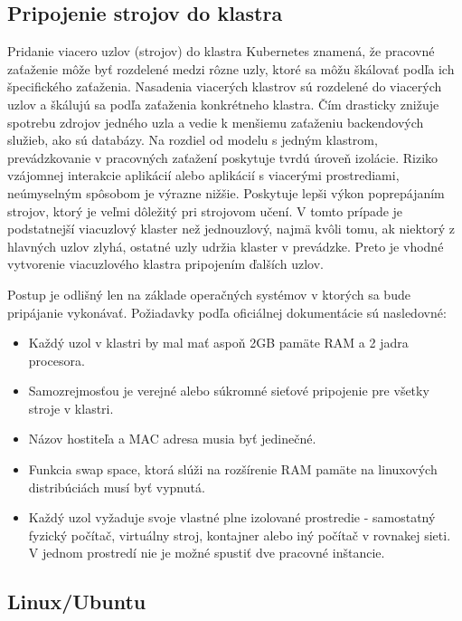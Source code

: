 \subsection{Pripojenie strojov do klastra}

Pridanie viacero uzlov (strojov) do klastra Kubernetes znamená, že pracovné zaťaženie môže byť rozdelené medzi rôzne uzly, ktoré sa môžu škálovať podľa ich špecifického zaťaženia. Nasadenia viacerých klastrov sú rozdelené do viacerých uzlov a škálujú sa podľa zaťaženia konkrétneho klastra. Čím drasticky znižuje spotrebu zdrojov jedného uzla a vedie k menšiemu zaťaženiu backendových služieb, ako sú databázy. Na rozdiel od modelu s jedným klastrom, prevádzkovanie v pracovných zaťažení poskytuje tvrdú úroveň izolácie. Riziko vzájomnej interakcie aplikácií alebo aplikácií s viacerými prostrediami, neúmyselným spôsobom je výrazne nižšie. Poskytuje lepši výkon poprepájaním strojov, ktorý je veľmi dôležitý pri strojovom učení. V tomto prípade je podstatnejší viacuzlový klaster než jednouzlový, najmä kvôli tomu, ak niektorý z hlavných uzlov zlyhá, ostatné uzly udržia klaster v prevádzke. Preto je vhodné vytvorenie viacuzlového klastra pripojením ďalších uzlov.

Postup je odlišný len na základe operačných systémov v ktorých sa bude pripájanie vykonávať. Požiadavky podľa oficiálnej dokumentácie sú nasledovné:

\begin{itemize}
    \item Každý uzol v klastri by mal mať aspoň 2GB pamäte RAM a 2 jadra procesora.
    \item Samozrejmosťou je verejné alebo súkromné sieťové pripojenie pre všetky stroje v klastri.
    \item Názov hostiteľa a MAC adresa musia byť jedinečné.
    \item Funkcia swap space, ktorá slúži na rozšírenie RAM pamäte na linuxových distribúciách musí byť vypnutá.
    \item Každý uzol vyžaduje svoje vlastné plne izolované prostredie - samostatný fyzický počítač, virtuálny stroj, kontajner alebo iný počítač v rovnakej sieti. V jednom prostredí nie je možné spustiť dve pracovné inštancie.
\end{itemize}

\subsection*{Linux/Ubuntu}

